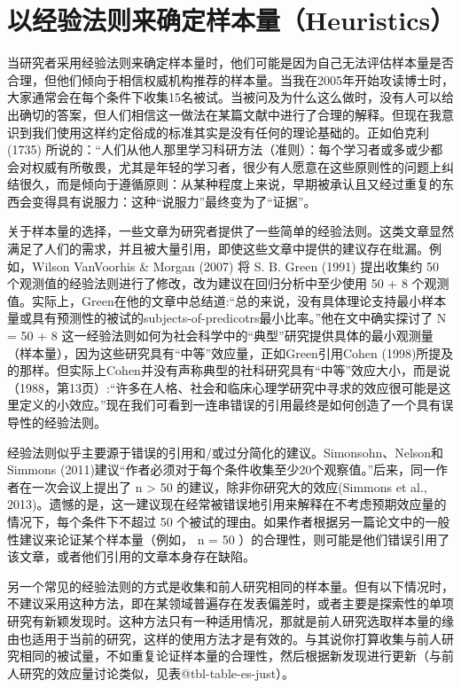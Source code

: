 \documentclass[
  letterpaper,
  DIV=11,
  numbers=noendperiod]{scrreprt}
\begin{document}
\hypertarget{ux4ee5ux7ecfux9a8cux6cd5ux5219ux6765ux786eux5b9aux6837ux672cux91cfheuristics}{%
\section{以经验法则来确定样本量（Heuristics）}\label{ux4ee5ux7ecfux9a8cux6cd5ux5219ux6765ux786eux5b9aux6837ux672cux91cfheuristics}}

当研究者采用经验法则来确定样本量时，他们可能是因为自己无法评估样本量是否合理，但他们倾向于相信权威机构推荐的样本量。当我在2005年开始攻读博士时，大家通常会在每个条件下收集15名被试。当被问及为什么这么做时，没有人可以给出确切的答案，但人们相信这一做法在某篇文献中进行了合理的解释。但现在我意识到我们使用这样约定俗成的标准其实是没有任何的理论基础的。正如伯克利
(1735)
所说的：``人们从他人那里学习科研方法（准则）：每个学习者或多或少都会对权威有所敬畏，尤其是年轻的学习者，很少有人愿意在这些原则性的问题上纠结很久，而是倾向于遵循原则：从某种程度上来说，早期被承认且又经过重复的东西会变得具有说服力：这种``说服力''最终变为了``证据''。

关于样本量的选择，一些文章为研究者提供了一些简单的经验法则。这类文章显然满足了人们的需求，并且被大量引用，即使这些文章中提供的建议存在纰漏。例如，Wilson
VanVoorhis \& Morgan (2007) 将 S. B. Green (1991) 提出收集约 50
个观测值的经验法则进行了修改，改为建议在回归分析中至少使用 50 + 8
个观测值。实际上，Green在他的文章中总结道:``总的来说，没有具体理论支持最小样本量或具有预测性的被试的subjects-of-predicotrs最小比率。''他在文中确实探讨了
N = 50 + 8
这一经验法则如何为社会科学中的``典型''研究提供具体的最小观测量（样本量），因为这些研究具有``中等''效应量，正如Green引用Cohen
(1998)所提及的那样。但实际上Cohen并没有声称典型的社科研究具有``中等''效应大小，而是说（1988，第13页）:``许多在人格、社会和临床心理学研究中寻求的效应很可能是这里定义的小效应。''现在我们可看到一连串错误的引用最终是如何创造了一个具有误导性的经验法则。

经验法则似乎主要源于错误的引用和/或过分简化的建议。Simonsohn、Nelson和Simmons
(2011)建议``作者必须对于每个条件收集至少20个观察值。''后来，同一作者在一次会议上提出了
n \textgreater{} 50 的建议，除非你研究大的效应(Simmons et al.,
2013)。遗憾的是，这一建议现在经常被错误地引用来解释在不考虑预期效应量的情况下，每个条件下不超过
50
个被试的理由。如果作者根据另一篇论文中的一般性建议来论证某个样本量（例如，
n = 50
）的合理性，则可能是他们错误引用了该文章，或者他们引用的文章本身存在缺陷。

另一个常见的经验法则的方式是收集和前人研究相同的样本量。但有以下情况时，不建议采用这种方法，即在某领域普遍存在发表偏差时，或者主要是探索性的单项研究有新颖发现时。这种方法只有一种适用情况，那就是前人研究选取样本量的缘由也适用于当前的研究，这样的使用方法才是有效的。与其说你打算收集与前人研究相同的被试量，不如重复论证样本量的合理性，然后根据新发现进行更新（与前人研究的效应量讨论类似，见表@tbl-table-es-just）。
\end{document}
